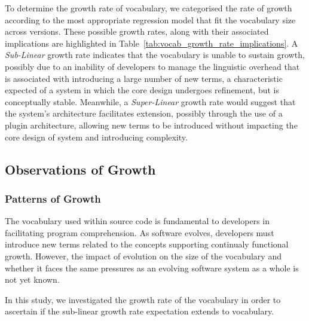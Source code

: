 
To determine the growth rate of vocabulary, we categorised the rate of growth according to the most appropriate regression model that fit the vocabulary size across versions. These possible growth rates, along with their associated implications are highlighted in Table~\ref{tab:vocab_growth_rate_implications}. A \emph{Sub-Linear} growth rate indicates that the vocabulary is unable to sustain growth, possibly due to an inability of developers to manage the linguistic overhead that is associated with introducing a large number of new terms, a characteristic expected of a system in which the core design undergoes refinement, but is conceptually stable. Meanwhile, a \emph{Super-Linear} growth rate would suggest that the system's architecture facilitates extension, possibly through the use of a plugin architecture, allowing new terms to be introduced without impacting the core design of system and introducing complexity.


\subsection{Observations of Growth} %
\label{sub:observations_of_growth}

\subsubsection{Patterns of Growth} %
\label{ssub:patterns_of_growth}

The vocabulary used within source code is fundamental to developers in facilitating program comprehension. As software evolves, developers must introduce new terms related to the concepts supporting continualy functional growth. However, the impact of evolution on the size of the vocabulary and whether it faces the same pressures as an evolving software system as a whole is not yet known.

In this study, we investigated the growth rate of the vocabulary in order to ascertain if the sub-linear growth rate expectation extends to vocabulary.

